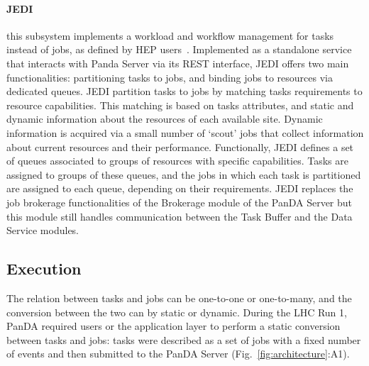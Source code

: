 \paragraph{\textbf{JEDI}} this subsystem implements a workload and workflow
management for tasks instead of jobs, as defined by HEP
users~\cite{borodin2015scaling}. Implemented as a standalone service that
interacts with Panda Server via its REST interface, JEDI offers two main
functionalities: partitioning tasks to jobs, and binding jobs to resources via
dedicated queues. JEDI partition tasks to jobs by matching tasks requirements to
resource capabilities. This matching is based on tasks attributes, and static
and dynamic information about the resources of each available site. Dynamic
information is acquired via a small number of `scout' jobs that collect
information about current resources and their performance. Functionally, JEDI
defines a set of queues associated to groups of resources with specific
capabilities. Tasks are assigned to groups of these queues, and the jobs in
which each task is partitioned are assigned to each queue, depending on their
requirements. JEDI replaces the job brokerage functionalities of the Brokerage
module of the PanDA Server but this module still handles communication between
the Task Buffer and the Data Service modules.


\subsection{Execution}
\label{ssec:panda_exec}


The relation between tasks and jobs can be one-to-one or one-to-many, and the
conversion between the two can by static or dynamic. During the LHC Run 1, PanDA
required users or the application layer to perform a static conversion between
tasks and jobs: tasks were described as a set of jobs with a fixed number of
events and then submitted to the PanDA Server (Fig.~\ref{fig:architecture}:A1).

